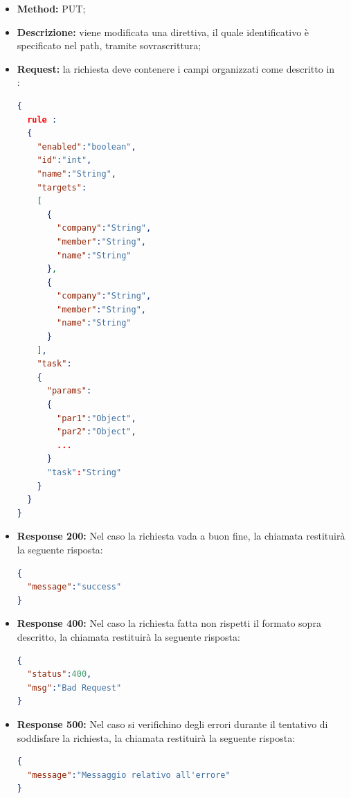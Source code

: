 \begin{itemize}
\begin{itemize}
\item \textbf{Method:} PUT;
\item \textbf{Descrizione:} viene modificata una direttiva, il quale identificativo è specificato nel path, tramite sovrascrittura;
\item \textbf{Request:} la richiesta deve contenere i campi organizzati come descritto in \\:
\begin{lstlisting}[language=json,firstnumber=1]
{
  rule :
  {
    "enabled":"boolean",
    "id":"int",
    "name":"String",
    "targets":
    [
      {
        "company":"String",
        "member":"String",
        "name":"String"
      },
      {
        "company":"String",
        "member":"String",
        "name":"String"
      }
    ],
    "task":
    {
      "params":
      {
        "par1":"Object",
        "par2":"Object",
        ...
      }
      "task":"String"
    }
  }
}
\end{lstlisting}
\item \textbf{Response 200:} Nel caso la richiesta vada a buon fine, la chiamata restituirà la seguente risposta:
\begin{lstlisting}[language=json,firstnumber=1]
{
  "message":"success"
}
\end{lstlisting}
\item \textbf{Response 400:} Nel caso la richiesta fatta non rispetti il formato sopra descritto, la chiamata restituirà la seguente risposta:
\begin{lstlisting}[language=json,firstnumber=1]
{
  "status":400,
  "msg":"Bad Request"
}
\end{lstlisting}
\item \textbf{Response 500:} Nel caso si verifichino degli errori durante il tentativo di soddisfare la richiesta, la chiamata restituirà la seguente risposta:
\begin{lstlisting}[language=json,firstnumber=1]
{
  "message":"Messaggio relativo all'errore"
}
\end{lstlisting}
\end{itemize}


\end{itemize}
